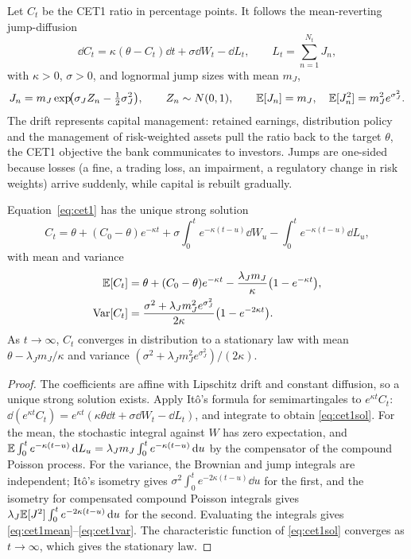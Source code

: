 Let $C_t$ be the CET1 ratio in percentage points. It follows the mean-reverting
jump-diffusion
\begin{equation}\label{eq:cet1}
  \dd C_t = \kappa(\theta-C_t)\dd t + \sigma\dd W_t - \dd L_t,
  \qquad L_t=\sum_{n=1}^{N_t}J_n,
\end{equation}
with $\kappa>0$, $\sigma>0$, and lognormal jump sizes with mean $m_J$,
\begin{equation}\label{eq:jumps}
  J_n = m_J\exp\!\bigl(\sigma_J Z_n-\tfrac12\sigma_J^2\bigr),\qquad Z_n\sim N(0,1),
  \qquad \mathbb{E}[J_n]=m_J,\quad \mathbb{E}[J_n^2]=m_J^2e^{\sigma_J^2}.
\end{equation}
The drift represents capital management: retained earnings, distribution policy and
the management of risk-weighted assets pull the ratio back to the target $\theta$, the
CET1 objective the bank communicates to investors. Jumps are one-sided because losses
(a fine, a trading loss, an impairment, a regulatory change in risk weights) arrive
suddenly, while capital is rebuilt gradually.

\begin{proposition}\label{prop:cet1}
Equation~\eqref{eq:cet1} has the unique strong solution
\begin{equation}\label{eq:cet1sol}
  C_t = \theta + (C_0-\theta)e^{-\kappa t}
  + \sigma\int_0^t e^{-\kappa(t-u)}\dd W_u
  - \int_0^t e^{-\kappa(t-u)}\dd L_u ,
\end{equation}
with mean and variance
\begin{align}
  \mathbb{E}[C_t] &= \theta + (C_0-\theta)e^{-\kappa t} - \frac{\lambda_J m_J}{\kappa}\bigl(1-e^{-\kappa t}\bigr),
  \label{eq:cet1mean}\\
  \operatorname{Var}[C_t] &= \frac{\sigma^2+\lambda_J m_J^2e^{\sigma_J^2}}{2\kappa}\bigl(1-e^{-2\kappa t}\bigr).
  \label{eq:cet1var}
\end{align}
As $t\to\infty$, $C_t$ converges in distribution to a stationary law with mean
$\theta-\lambda_Jm_J/\kappa$ and variance $(\sigma^2+\lambda_Jm_J^2e^{\sigma_J^2})/(2\kappa)$.
\end{proposition}

\begin{proof}
The coefficients are affine with Lipschitz drift and constant diffusion, so a unique
strong solution exists. Apply It\^o's formula for semimartingales to
$e^{\kappa t}C_t$: $\dd(e^{\kappa t}C_t)=e^{\kappa t}(\kappa\theta\dd t+\sigma\dd W_t-\dd L_t)$,
and integrate to obtain \eqref{eq:cet1sol}. For the mean, the stochastic integral against
$W$ has zero expectation, and
$\mathbb{E}\int_0^te^{-\kappa(t-u)}\,\mathrm{d} L_u=\lambda_Jm_J\int_0^te^{-\kappa(t-u)}\,\mathrm{d} u$ by the
compensator of the compound Poisson process. For the variance, the Brownian and jump
integrals are independent; It\^o's isometry gives
$\sigma^2\int_0^te^{-2\kappa(t-u)}\dd u$ for the first, and the isometry for compensated
compound Poisson integrals gives $\lambda_J\mathbb{E}[J^2]\int_0^te^{-2\kappa(t-u)}\,\mathrm{d} u$ for the
second. Evaluating the integrals gives \eqref{eq:cet1mean}--\eqref{eq:cet1var}. The
characteristic function of \eqref{eq:cet1sol} converges as $t\to\infty$, which gives
the stationary law.
\end{proof}

